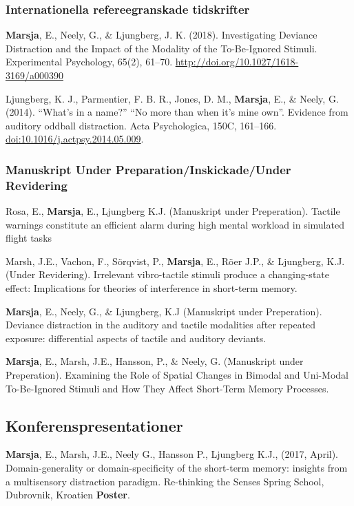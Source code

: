 \documentclass[]{article}
\begin{document}
\subsubsection{Internationella refereegranskade
tidskrifter}\label{internationella-refereegranskade-tidskrifter}

\textbf{Marsja}, E., Neely, G., \& Ljungberg, J. K. (2018).
Investigating Deviance Distraction and the Impact of the Modality of the
To-Be-Ignored Stimuli. Experimental Psychology, 65(2), 61--70.
\url{http://doi.org/10.1027/1618-3169/a000390}

Ljungberg, K. J., Parmentier, F. B. R., Jones, D. M., \textbf{Marsja},
E., \& Neely, G. (2014). ``What's in a name?'' ``No more than when it's
mine own''. Evidence from auditory oddball distraction. Acta
Psychologica, 150C, 161--166. \url{doi:10.1016/j.actpsy.2014.05.009}.

\subsubsection{Manuskript Under Preparation/Inskickade/Under
Revidering}\label{manuskript-under-preparationinskickadeunder-revidering}

Rosa, E., \textbf{Marsja}, E., Ljungberg K.J. (Manuskript under
Preperation). Tactile warnings constitute an efficient alarm during high
mental workload in simulated flight tasks

Marsh, J.E., Vachon, F., Sörqvist, P., \textbf{Marsja}, E., Röer J.P.,
\& Ljungberg, K.J. (Under Revidering). Irrelevant vibro-tactile stimuli
produce a changing-state effect: Implications for theories of
interference in short-term memory.

\textbf{Marsja}, E., Neely, G., \& Ljungberg, K.J (Manuskript under
Preperation). Deviance distraction in the auditory and tactile
modalities after repeated exposure: differential aspects of tactile and
auditory deviants.

\textbf{Marsja}, E., Marsh, J.E., Hansson, P., \& Neely, G. (Manuskript
under Preperation). Examining the Role of Spatial Changes in Bimodal and
Uni-Modal To-Be-Ignored Stimuli and How They Affect Short-Term Memory
Processes.

\subsection{Konferenspresentationer}\label{konferenspresentationer}

\textbf{Marsja}, E., Marsh, J.E., Neely G., Hansson P., Ljungberg K.J.,
(2017, April). Domain-generality or domain-specificity of the short-term
memory: insights from a multisensory distraction paradigm. Re-thinking
the Senses Spring School, Dubrovnik, Kroatien \textbf{Poster}.
\end{document}
